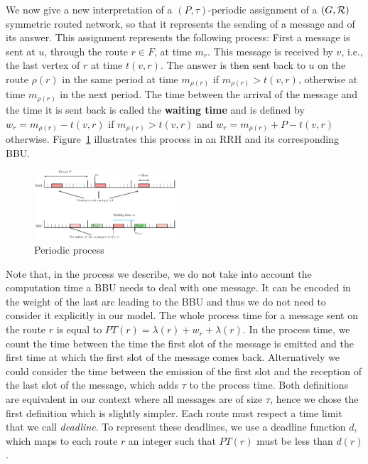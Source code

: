 \documentclass[10pt, conference, letterpaper]{IEEEtran}
\begin{document}
      We now give a new interpretation of a $(P,\tau)$-periodic assignment of a $(G,{\cal R})$ symmetric routed network, so that it represents the sending of a message and of its answer.
      This assignment represents the following process: First a message is sent at $u$, through the route $r \in F$, at time $m_r$.
      This message is received by $v$, i.e., the last vertex of $r$ at time $t(v,r)$. The answer is then sent back to $u$ on the route $\rho(r)$ in the same period at time $m_{\rho(r)}$ if $m_{\rho(r)} > t(v,r)$, otherwise at time $m_{\rho(r)}$ in the next period. The time between the arrival of the message and the time it is sent back is called the \textbf{waiting time} and is defined by $w_r = m_{\rho(r)} - t(v,r)$ if $m_{\rho(r)} > t(v,r)$ and $w_r = m_{\rho(r)} + P - t(v,r)$ otherwise. Figure~\ref{fig:assignment} illustrates this process in an RRH and its corresponding BBU.
 
     \begin{figure}[h]
      \begin{center}
      \includegraphics[width=0.47\textwidth]{rrh.pdf}
      \end{center}
      \caption{Periodic process}\label{fig:assignment}
      \end{figure}
      
      Note that, in the process we describe, we do not take into account the computation time a BBU needs to deal with one message. It can be encoded in the weight of the last arc leading to the BBU and thus we do not need to consider it explicitly in our model. 
      The whole process time for a message sent on the route $r$ is equal to $PT(r)=\lambda(r)+ w_r+\lambda(r)$.      
      In the process time, we count the time between the time the first slot of the message is emitted and the first time at which the first slot of the message comes back. Alternatively we could consider the time between the emission of the first slot and the reception of the last slot of the message, which adds $\tau$ to the process time. Both definitions are equivalent in our context where all messages are of size $\tau$, hence we chose the first definition which is slightly simpler. 
      Each route must respect a time limit that we call \emph{deadline}. To represent these deadlines, 
      we use a deadline function $d$, which maps to each route $r$ an integer such that $PT(r)$ must be less than $d(r)$.
      
\end{document}

